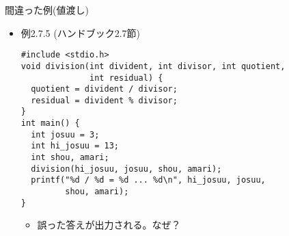 \begin{frame}[t,fragile]{間違った例(値渡し)}
  \begin{itemize}
  \item 例2.7.5 (ハンドブック2.7節)
\begin{lstlisting}
#include <stdio.h>
void division(int divident, int divisor, int quotient,
              int residual) {
  quotient = divident / divisor;
  residual = divident % divisor;
}
int main() {
  int josuu = 3;
  int hi_josuu = 13;
  int shou, amari;
  division(hi_josuu, josuu, shou, amari);
  printf("%d / %d = %d ... %d\n", hi_josuu, josuu,
         shou, amari);
}
\end{lstlisting}
  \begin{itemize}
  \item 誤った答えが出力される。なぜ？
  \end{itemize}
  \end{itemize}
\end{frame}

